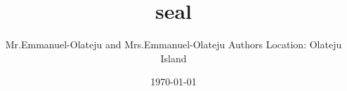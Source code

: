 \documentclass[12pt]{article}
\begin{document}
\title{seal}
\author{Mr.Emmanuel-Olateju and Mrs.Emmanuel-Olateju \cr Authors Location: Olateju Island}
\date{\today}
\maketitle
\end{document}

